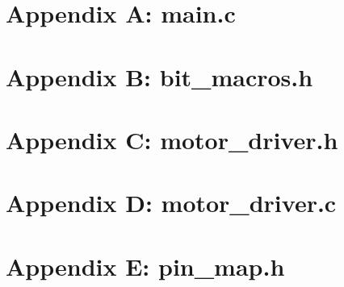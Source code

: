 \documentclass[letterpaper,11pt]{texMemo} %
\begin{document}
\section*{Appendix A: main.c}
\begin{tiny}

\end{tiny}
\newpage

\section*{Appendix B: bit\_macros.h}
\begin{tiny}

\end{tiny}
\newpage

\section*{Appendix C: motor\_driver.h}
\begin{tiny}

\end{tiny}
\newpage

\section*{Appendix D: motor\_driver.c}
\begin{tiny}

\end{tiny}
\newpage

\section*{Appendix E: pin\_map.h}
\begin{tiny}

\end{tiny}
\newpage
\end{document}
